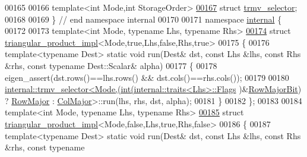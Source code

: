 \begin{DoxyCode}
00165 
00166 \textcolor{keyword}{template}<\textcolor{keywordtype}{int} Mode,\textcolor{keywordtype}{int} StorageOrder>
\hyperlink{struct_eigen_1_1internal_1_1trmv__selector}{00167} \textcolor{keyword}{struct }\hyperlink{struct_eigen_1_1internal_1_1trmv__selector}{trmv\_selector};
00168 
00169 \} \textcolor{comment}{// end namespace internal}
00170 
00171 \textcolor{keyword}{namespace }\hyperlink{namespaceinternal}{internal} \{
00172 
00173 \textcolor{keyword}{template}<\textcolor{keywordtype}{int} Mode, \textcolor{keyword}{typename} Lhs, \textcolor{keyword}{typename} Rhs>
\hyperlink{struct_eigen_1_1internal_1_1triangular__product__impl_3_01_mode_00_01true_00_01_lhs_00_01false_00_01_rhs_00_01true_01_4}{00174} \textcolor{keyword}{struct }\hyperlink{struct_eigen_1_1internal_1_1triangular__product__impl}{triangular\_product\_impl}<Mode,true,Lhs,false,Rhs,true>
00175 \{
00176   \textcolor{keyword}{template}<\textcolor{keyword}{typename} Dest> \textcolor{keyword}{static} \textcolor{keywordtype}{void} run(Dest& dst, \textcolor{keyword}{const} Lhs &lhs, \textcolor{keyword}{const} Rhs &rhs, \textcolor{keyword}{const} \textcolor{keyword}{typename} 
      Dest::Scalar& alpha)
00177   \{
00178     eigen\_assert(dst.rows()==lhs.rows() && dst.cols()==rhs.cols());
00179   
00180     \hyperlink{struct_eigen_1_1internal_1_1trmv__selector}{internal::trmv\_selector<Mode,(int(internal::traits<Lhs>::Flags}
      )&\hyperlink{group__flags_gae4f56c2a60bbe4bd2e44c5b19cbe8762}{RowMajorBit}) ? \hyperlink{group__enums_ggaacded1a18ae58b0f554751f6cdf9eb13acfcde9cd8677c5f7caf6bd603666aae3}{RowMajor} : \hyperlink{group__enums_ggaacded1a18ae58b0f554751f6cdf9eb13a0cbd4bdd0abcfc0224c5fcb5e4f6669a}{ColMajor}>::run(lhs, rhs, dst, alpha);
00181   \}
00182 \};
00183 
00184 \textcolor{keyword}{template}<\textcolor{keywordtype}{int} Mode, \textcolor{keyword}{typename} Lhs, \textcolor{keyword}{typename} Rhs>
\hyperlink{struct_eigen_1_1internal_1_1triangular__product__impl_3_01_mode_00_01false_00_01_lhs_00_01true_00_01_rhs_00_01false_01_4}{00185} \textcolor{keyword}{struct }\hyperlink{struct_eigen_1_1internal_1_1triangular__product__impl}{triangular\_product\_impl}<Mode,false,Lhs,true,Rhs,false>
00186 \{
00187   \textcolor{keyword}{template}<\textcolor{keyword}{typename} Dest> \textcolor{keyword}{static} \textcolor{keywordtype}{void} run(Dest& dst, \textcolor{keyword}{const} Lhs &lhs, \textcolor{keyword}{const} Rhs &rhs, \textcolor{keyword}{const} \textcolor{keyword}{typename} 

\end{DoxyCode}
